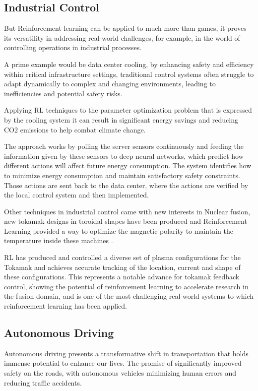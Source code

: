 \subsection*{Industrial Control}
But Reinforcement learning can be applied to much more than games, it proves its versatility in addressing real-world challenges, for example, in the world of controlling operations in industrial processes.

A prime example would be data center cooling, by enhancing safety and efficiency within critical infrastructure settings, traditional control systems often struggle to adapt dynamically to complex and changing environments, leading to inefficiencies and potential safety risks.

Applying RL techniques to the parameter optimization problem that is expressed by the cooling system it can result in significant energy savings and reducing CO2 emissions to help combat climate change.

The approach works by polling the server sensors continuously and feeding the information given by these sensors to deep neural networks, which predict how different actions will affect future energy consumption. The system identifies how to minimize energy consumption and maintain satisfactory safety constraints. Those actions are sent back to the data center, where the actions are verified by the local control system and then implemented.

Other techniques in industrial control came with new interests in Nuclear fusion, new tokamak designs in toroidal shapes have been produced and Reinforcement Learning provided a way to optimize the magnetic polarity to maintain the temperature inside these machines \cite{degrave2022magnetic}.

RL has produced and controlled a diverse set of plasma configurations for the Tokamak and achieves accurate tracking of the location, current and shape of these configurations. This represents a notable advance for tokamak feedback control, showing the potential of reinforcement learning to accelerate research in the fusion domain, and is one of the most challenging real-world systems to which reinforcement learning has been applied.

\subsection*{Autonomous Driving}
Autonomous driving presents a transformative shift in transportation that holds immense potential to enhance our lives. The promise of significantly improved safety on the roads, with autonomous vehicles minimizing human errors and reducing traffic accidents. 

